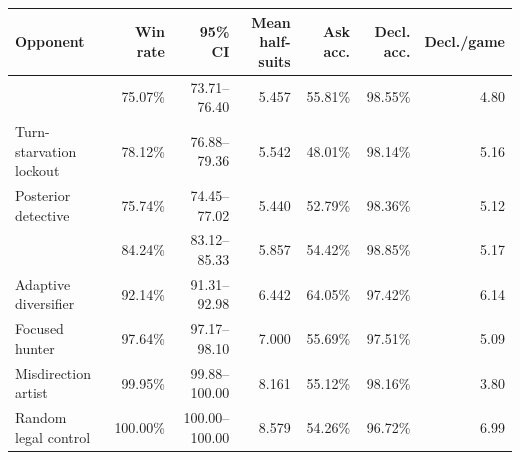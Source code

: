 \begin{tabular}{lrrrrrr}
\toprule
Opponent & Win rate & 95\% CI & Mean half-suits & Ask acc. & Decl. acc. & Decl./game \\
\midrule
\vthree{} & 75.07\% & 73.71--76.40 & 5.457 & 55.81\% & 98.55\% & 4.80 \\
Turn-starvation lockout & 78.12\% & 76.88--79.36 & 5.542 & 48.01\% & 98.14\% & 5.16 \\
Posterior detective & 75.74\% & 74.45--77.02 & 5.440 & 52.79\% & 98.36\% & 5.12 \\
\vtwo{} & 84.24\% & 83.12--85.33 & 5.857 & 54.42\% & 98.85\% & 5.17 \\
Adaptive diversifier & 92.14\% & 91.31--92.98 & 6.442 & 64.05\% & 97.42\% & 6.14 \\
Focused hunter & 97.64\% & 97.17--98.10 & 7.000 & 55.69\% & 97.51\% & 5.09 \\
Misdirection artist & 99.95\% & 99.88--100.00 & 8.161 & 55.12\% & 98.16\% & 3.80 \\
Random legal control & 100.00\% & 100.00--100.00 & 8.579 & 54.26\% & 96.72\% & 6.99 \\
\bottomrule
\end{tabular}